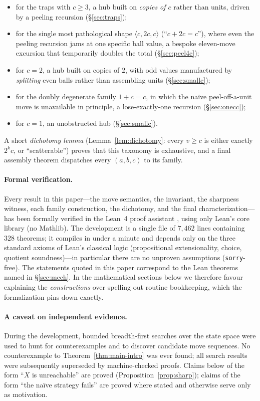 \documentclass[11pt]{article}
\theoremstyle{definition}
\theoremstyle{remark}
\newcommand{\lie}[3]{\langle #1,#2,#3\rangle}
\begin{document}
\begin{itemize}
\item for the traps with $c\ge 3$, a hub built on \emph{copies of $c$}
rather than units, driven by a peeling recursion
(\S\ref{sec:traps});
\item for the single most pathological shape $\lie{c}{2c}{c}$
(``$c+2c=c$''), where even the peeling recursion jams at one specific ball
value, a bespoke eleven-move excursion that temporarily doubles the total
(\S\ref{sec:peel4c});
\item for $c=2$, a hub built on copies of $2$, with odd values manufactured
by \emph{splitting} even balls rather than assembling units
(\S\ref{sec:smallc});
\item for the doubly degenerate family $1+c=c$, in which the na\"ive
peel-off-a-unit move is unavailable in principle, a
lose-exactly-one recursion (\S\ref{sec:onecc});
\item for $c=1$, an unobstructed hub (\S\ref{sec:smallc}).
\end{itemize}

A short \emph{dichotomy lemma} (Lemma~\ref{lem:dichotomy}: every $v\ge c$ is
either exactly $2^kc$, or ``scatterable'') proves that this taxonomy is
exhaustive, and a final assembly theorem dispatches every $(a,b,c)$ to its
family.

\paragraph{Formal verification.}
Every result in this paper---the move semantics, the invariant, the
sharpness witness, each family construction, the dichotomy, and the final
characterization---has been formally verified in the Lean~4 proof assistant
\cite{lean4}, using only Lean's core library (no \textsf{Mathlib}).  The
development is a single file of $7{,}462$ lines containing $328$ theorems;
it compiles in under a minute and depends only on the three standard
axioms of Lean's classical logic (propositional extensionality, choice,
quotient soundness)---in particular there are no unproven assumptions
(\texttt{sorry}-free).  The statements quoted in this paper correspond to
the Lean theorems named in \S\ref{sec:mech}.  In the mathematical sections
below we therefore favour explaining the \emph{constructions} over spelling
out routine bookkeeping, which the formalization pins down exactly.

\paragraph{A caveat on independent evidence.}
During the development, bounded breadth-first searches over the state space
were used to hunt for counterexamples and to discover candidate move
sequences.  No counterexample to Theorem~\ref{thm:main-intro} was ever
found; all search results were subsequently superseded by machine-checked
proofs.  Claims below of the form ``$X$ is unreachable'' are proved
(Proposition~\ref{prop:sharp}); claims of the form ``the na\"ive strategy
fails'' are proved where stated and otherwise serve only as motivation.
\end{document}
